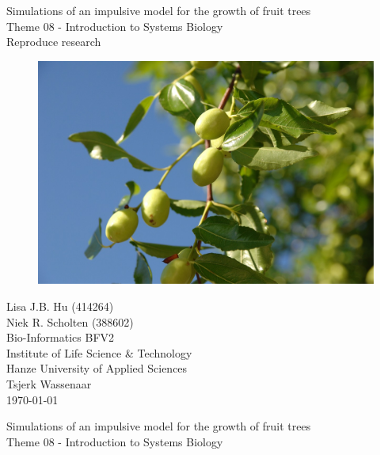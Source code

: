 \begin{center}

\Huge{Simulations of an impulsive model for the growth of fruit trees}\\
\vspace{\baselineskip}
\LARGE{Theme 08 - Introduction to Systems Biology}\\
\large{Reproduce research}\\
\vspace{\baselineskip}

\begin{figure}
  \centering\includegraphics[width=\linewidth]{jujube}
  \label{fig:jujube}
\end{figure}

\end{center}
\vspace{\baselineskip}

\normalsize
\vspace*{\fill}
\begin{flushright}
Lisa J.B. Hu (414264)\\
Niek R. Scholten (388602)\\
Bio-Informatics BFV2\\
Institute of Life Science \& Technology\\
Hanze University of Applied Sciences\\
Tsjerk Wassenaar\\
\today
\end{flushright}
\newpage

\null
\thispagestyle{empty}
\addtocounter{page}{-1}
\newpage

\begin{center}


\Huge{Simulations of an impulsive model for the growth of fruit trees}\\
\vspace{\baselineskip}
\LARGE{Theme 08 - Introduction to Systems Biology}\\
\vspace{\baselineskip}

\end{center}
\vspace{\baselineskip}


